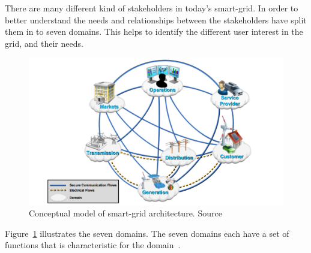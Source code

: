 There are many different kind of stakeholders in today's smart-grid. In order to better understand the needs and relationships between the stakeholders have  split them in to seven domains. This helps to identify the different user interest in the grid, and their needs.  

\newpage %

\begin{figure}[H]
\centering
\includegraphics[width=1\textwidth]{billeder/SMARTGRID.png}
\caption[Conceptual model of smart-grid architecture.]{Conceptual model of smart-grid architecture. Source~\citep{RefWorks:41}}
\label{fig:CMOSG}
\end{figure}
 
Figure~\ref{fig:CMOSG} illustrates the seven domains. The seven domains each have a set of functions that is characteristic for the domain~\citep{RefWorks:41}.  
 
